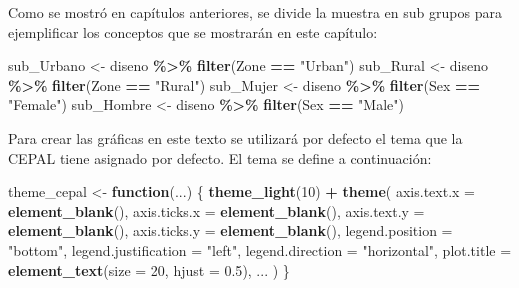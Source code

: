 \documentclass[
  12pt,
]{book}
\newenvironment{Shaded}{\begin{snugshade}}{\end{snugshade}}
\newcommand{\AttributeTok}[1]{\textcolor[rgb]{0.13,0.29,0.53}{#1}}
\newcommand{\ControlFlowTok}[1]{\textcolor[rgb]{0.13,0.29,0.53}{\textbf{#1}}}
\newcommand{\DecValTok}[1]{\textcolor[rgb]{0.00,0.00,0.81}{#1}}
\newcommand{\FloatTok}[1]{\textcolor[rgb]{0.00,0.00,0.81}{#1}}
\newcommand{\FunctionTok}[1]{\textcolor[rgb]{0.13,0.29,0.53}{\textbf{#1}}}
\newcommand{\NormalTok}[1]{#1}
\newcommand{\OtherTok}[1]{\textcolor[rgb]{0.56,0.35,0.01}{#1}}
\newcommand{\SpecialCharTok}[1]{\textcolor[rgb]{0.81,0.36,0.00}{\textbf{#1}}}
\newcommand{\StringTok}[1]{\textcolor[rgb]{0.31,0.60,0.02}{#1}}
\begin{document}
Como se mostró en capítulos anteriores, se divide la muestra en sub grupos para ejemplificar los conceptos que se mostrarán en este capítulo:

\begin{Shaded}
\begin{Highlighting}[]
\NormalTok{sub\_Urbano }\OtherTok{\textless{}{-}}\NormalTok{ diseno }\SpecialCharTok{\%\textgreater{}\%} \FunctionTok{filter}\NormalTok{(Zone }\SpecialCharTok{==} \StringTok{"Urban"}\NormalTok{)}
\NormalTok{sub\_Rural }\OtherTok{\textless{}{-}}\NormalTok{ diseno }\SpecialCharTok{\%\textgreater{}\%} \FunctionTok{filter}\NormalTok{(Zone }\SpecialCharTok{==} \StringTok{"Rural"}\NormalTok{)}
\NormalTok{sub\_Mujer }\OtherTok{\textless{}{-}}\NormalTok{ diseno }\SpecialCharTok{\%\textgreater{}\%} \FunctionTok{filter}\NormalTok{(Sex }\SpecialCharTok{==} \StringTok{"Female"}\NormalTok{)}
\NormalTok{sub\_Hombre }\OtherTok{\textless{}{-}}\NormalTok{ diseno }\SpecialCharTok{\%\textgreater{}\%} \FunctionTok{filter}\NormalTok{(Sex }\SpecialCharTok{==} \StringTok{"Male"}\NormalTok{)}
\end{Highlighting}
\end{Shaded}

Para crear las gráficas en este texto se utilizará por defecto el tema que la CEPAL tiene asignado por defecto. El tema se define a continuación:

\begin{Shaded}
\begin{Highlighting}[]
\NormalTok{theme\_cepal }\OtherTok{\textless{}{-}} \ControlFlowTok{function}\NormalTok{(...) \{}
  \FunctionTok{theme\_light}\NormalTok{(}\DecValTok{10}\NormalTok{) }\SpecialCharTok{+}
    \FunctionTok{theme}\NormalTok{(}
      \AttributeTok{axis.text.x =} \FunctionTok{element\_blank}\NormalTok{(),}
      \AttributeTok{axis.ticks.x =} \FunctionTok{element\_blank}\NormalTok{(),}
      \AttributeTok{axis.text.y =} \FunctionTok{element\_blank}\NormalTok{(),}
      \AttributeTok{axis.ticks.y =} \FunctionTok{element\_blank}\NormalTok{(),}
      \AttributeTok{legend.position =} \StringTok{"bottom"}\NormalTok{,}
      \AttributeTok{legend.justification =} \StringTok{"left"}\NormalTok{,}
      \AttributeTok{legend.direction =} \StringTok{"horizontal"}\NormalTok{,}
      \AttributeTok{plot.title =} \FunctionTok{element\_text}\NormalTok{(}\AttributeTok{size =} \DecValTok{20}\NormalTok{, }\AttributeTok{hjust =} \FloatTok{0.5}\NormalTok{),}
\NormalTok{      ...}
\NormalTok{    )}
\NormalTok{\}}
\end{Highlighting}
\end{Shaded}
\end{document}
